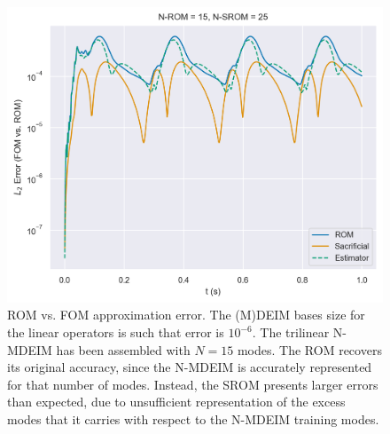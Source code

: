 \documentclass[../../thesis.tex]{subfiles}
\begin{document}
\begin{figure}[h]
    \includegraphics[width =\columnwidth]{research_project/piston/figures/nonlinear_displacement/arbitrary/error_estimation_rom_15_srom_25_modes_15.png}
    \caption{ROM vs. FOM approximation error.
    The (M)DEIM bases size for the linear operators is such that error is $10^{-6}$.
    The trilinear N-MDEIM has been assembled with $N=15$ modes. 
    The ROM recovers its original accuracy, since the N-MDEIM is accurately represented for 
    that number of modes.
    Instead, the SROM presents larger errors than expected, 
    due to unsufficient representation of the excess
    modes that it carries with respect to the N-MDEIM training modes.}
    \label{fig:nlinear_disp_modes_15_rom_15}
\end{figure}
\end{document}

